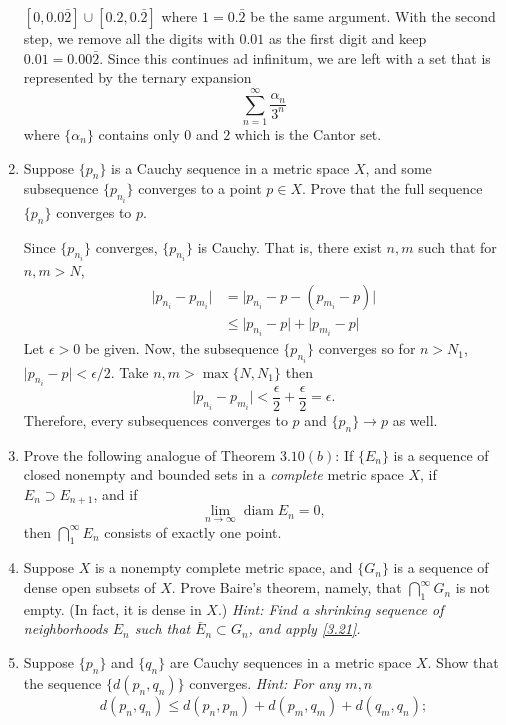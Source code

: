 \begin{enumerate}
  \([0, 0.0\bar{2}] \cup [0.2, 0.\bar{2}]\) where \(1 = 0.\bar{2}\) be the
  same argument.
  With the second step, we remove all the digits with \(0.01\) as the first
  digit and keep \(0.01 = 0.00\bar{2}\).
  Since this continues ad infinitum, we are left with a set that is
  represented by the ternary expansion
  \[
  \sum_{n = 1}^{\infty}\frac{\alpha_n}{3^n}
  \]
  where \(\{\alpha_n\}\) contains only \(0\) and \(2\) which is the Cantor set.
\item
  Suppose \(\{p_n\}\) is a Cauchy sequence in a metric space \(X\), and some
  subsequence \(\{p_{n_i}\}\) converges to a point \(p\in X\).
  Prove that the full sequence \(\{p_n\}\) converges to \(p\).
  \par\smallskip
  Since \(\{p_{n_i}\}\) converges, \(\{p_{n_i}\}\) is Cauchy.
  That is, there exist \(n,m\) such that for \(n,m > N\),
  \begin{align*}
    \lvert p_{n_i} - p_{m_i}\rvert
    & = \lvert p_{n_i} - p - (p_{m_i} - p)\rvert\\
    & \leq \lvert p_{n_i} - p\rvert + \lvert p_{m_i} - p\rvert
  \end{align*}
  Let \(\epsilon > 0\) be given.
  Now, the subsequence \(\{p_{n_i}\}\) converges so for \(n > N_1\),
  \(\lvert p_{n_i} - p\rvert < \epsilon/2\).
  Take \(n,m > \max\{N, N_1\}\) then
  \[
  \lvert p_{n_i} - p_{m_i}\rvert < \frac{\epsilon}{2} + \frac{\epsilon}{2}
  = \epsilon.
  \]
  Therefore, every subsequences converges to \(p\) and \(\{p_n\}\to p\) as
  well.
\item
  \label{3.21}
  Prove the following analogue of Theorem \(3.10(b)\): If \(\{E_n\}\) is a
  sequence of closed nonempty and bounded sets in a \textit{complete} metric
  space \(X\), if \(E_n\supset E_{n + 1}\), and if
  \[
  \lim_{n\to\infty}\operatorname{diam} E_n = 0,
  \]
  then \(\bigcap_1^{\infty}E_n\) consists of exactly one point.
\item
  Suppose \(X\) is a nonempty complete metric space, and \(\{G_n\}\) is a
  sequence of dense open subsets of \(X\).
  Prove Baire's theorem, namely, that \(\bigcap_1^{\infty}G_n\) is not empty.
  (In fact, it is dense in \(X\).)
  \textit{Hint: Find a shrinking sequence of neighborhoods \(E_n\) such that
    \(\bar{E}_n\subset G_n\), and apply \cref{3.21}.}
\item
  \label{3.23}
  Suppose \(\{p_n\}\) and \(\{q_n\}\) are Cauchy sequences in a metric space
  \(X\).
  Show that the sequence \(\{d(p_n,q_n)\}\) converges.
  \textit{Hint: For any \(m,n\)
    \[
    d(p_n, q_n)\leq d(p_n, p_m) + d(p_m, q_m) + d(q_m, q_n);
\]}
\end{enumerate}
